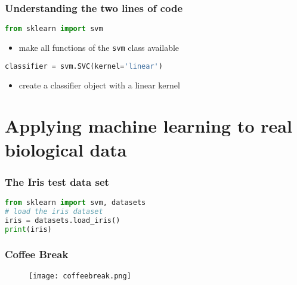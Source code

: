 \begin{frame}[c,fragile]\frametitle{Understanding the two lines of code}

  \begin{lstlisting}[language=Python]
from sklearn import svm
  \end{lstlisting}
  \begin{itemize}
    \item {\small make all functions of the \texttt{svm} class available}
  \end{itemize}
  
\pause
  \begin{lstlisting}[language=Python]
classifier = svm.SVC(kernel='linear')
  \end{lstlisting}
  \begin{itemize}
    \item {\small create a classifier object with a linear kernel}
  \end{itemize}

\end{frame}

\section[Iris data]{Applying machine learning to real biological data}

\begin{frame}[c, fragile]\frametitle{The Iris test data set}

  \begin{lstlisting}[language=Python]
from sklearn import svm, datasets
# load the iris dataset
iris = datasets.load_iris()
print(iris)
  \end{lstlisting}
\end{frame}

\beginbackup

\begin{frame}[c]\frametitle{Coffee Break}
  \begin{figure}[htbp]
    \centering
    \texttt{[image: coffeebreak.png]}
  \end{figure}
\end{frame}

\backupend

